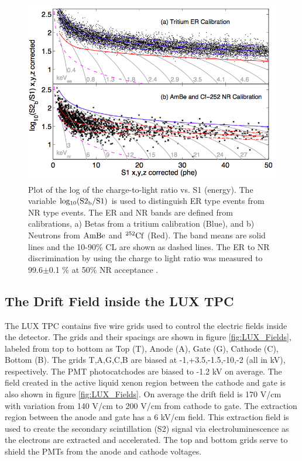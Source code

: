  \begin{figure}[h!]\centering
\includegraphics[scale=.5]{Chapter_LUX_Det/ER_NR_Band_Cal.png}
\caption{Plot of the log of the charge-to-light ratio vs. S1 (energy). The variable $\rm log_{10}(S2_b/S1)$ is used to distinguish ER type events from NR type events. The ER and NR bands are defined from calibrations, a) Betas from a tritium calibration (Blue), and b) Neutrons from $\rm AmBe$ and $\rm ^{252}Cf$ (Red). The band means are solid lines and the 10-90\% CL are shown as dashed lines. The ER to NR discrimination by using the charge to light ratio was measured to 99.6$\pm$0.1 \% at 50\% NR acceptance \cite{LUX_PRL}.}
\label{fig:LUX_ER_NR_Band}
\end{figure}

\newpage

\subsection{The Drift Field inside the LUX TPC}

The LUX TPC contains five wire grids used to control the electric fields inside the detector. The grids and their spacings are shown in figure \ref{fig:LUX_Fields}, labeled from top to bottom as Top  (T), Anode (A), Gate (G), Cathode (C), Bottom (B). The grids T,A,G,C,B are biased at -1,+3.5,-1.5,-10,-2 (all in kV), respectively. The PMT photocatchodes are biased to -1.2 kV on average. The field created in the active liquid xenon region between the cathode and gate is also shown in figure \ref{fig:LUX_Fields}. On average the drift field is 170 V/cm with variation from 140 V/cm to 200 V/cm  from cathode to gate. The extraction region between the anode and gate has a 6 kV/cm field. This extraction field is used to create the secondary scintillation (S2) signal via electroluminescence as the electrons are extracted and accelerated. The top and bottom grids serve to shield the PMTs from the anode and cathode voltages.  

